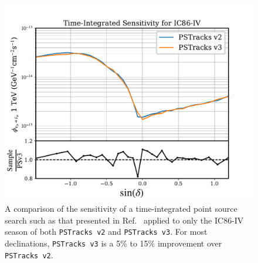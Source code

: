 \documentclass[aps,10pt,prd,twocolumn,floats,letterpaper,showpacs,nofootinbib,bibnotes,notitlepage,superscriptaddress,floatfix]{revtex4-1}
\begin{document}
\begin{figure}[p]
\centering
\includegraphics[width=0.5\linewidth,viewport= 0 0 530 390, clip=false]{PSTracksRelease/TXSCheckPlots/v2v3_senscompare.pdf}
\caption[]{A comparison of the sensitivity of a time-integrated point source search such as that presented in Ref.~\cite{Aartsen:2019fau} applied to only the IC86-IV season of both {\tt PSTracks v2} and {\tt PSTracks v3}. For most declinations, {\tt PSTracks v3} is a 5\% to 15\% improvement over {\tt PSTracks v2}.}\label{fig:v2v3senscompare}
\end{figure}
\end{document}
